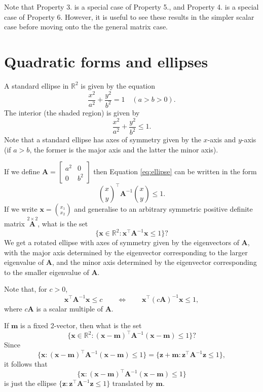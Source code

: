 \documentclass[]{book}
\theoremstyle{definition}
\theoremstyle{definition}
\theoremstyle{definition}
\theoremstyle{remark}
\begin{document}
Note that Property 3. is a special case of Property 5., and Property 4. is a special case of Property 6.
However, it is useful to see these results in the simpler scalar case before moving onto the the general matrix case.

\hypertarget{quadratic-forms-and-ellipses}{%
\section{Quadratic forms and ellipses}\label{quadratic-forms-and-ellipses}}

A standard ellipse in \(\mathbb{R}^2\) is given by the equation
\[
\frac{x^2}{a^2}+\frac{y^2}{b^2}=1 \quad (a>b>0).
\]
The interior (the shaded region) is given by
\begin{equation}
\frac{x^2}{a^2}+\frac{y^2}{b^2}\leq 1.   \label{eq:ellipse}
\end{equation}
Note that a standard ellipse has axes of symmetry given by the \(x\)-axis and \(y\)-axis
(if \(a>b\), the former is the major axis and the latter the minor axis).

If we define
\({\mathbf A}=\left[ \begin{array}{cc} a^2&0\\ 0&b^2 \end{array} \right]\)
then Equation \eqref{eq:ellipse} can be written in the form
\[ \binom{x}{y}^\top {\mathbf A}^{-1} \binom{x}{y}\leq 1. \]
If we write \({\mathbf x}=\binom{x_1}{x_2}\) and generalise to an arbitrary symmetric
positive definite matrix \(\stackrel{2 \times 2}{\mathbf A}\), what is the set
\[ \{ {\mathbf x} \in \mathbb{R}^2 : {\mathbf x}^\top {\mathbf A}^{-1} {\mathbf x} \leq 1\} ? \]
We get a rotated ellipse with axes of symmetry given by the eigenvectors of \(\mathbf A\),
with the major axis determined by the eigenvector corresponding to the larger
eigenvalue of \(\mathbf A\), and the minor axis determined by the eigenvector corresponding
to the smaller eigenvalue of \(\mathbf A\).

Note that, for \(c>0\),
\[{\mathbf x}^\top {\mathbf A}^{-1} {\mathbf x}\leq c \qquad \Leftrightarrow \qquad {\mathbf x}^\top (c{\mathbf A})^{-1}{\mathbf x}\leq 1 ,\]
where \(c{\mathbf A}\) is a scalar multiple of \(\mathbf A\).

If \({\mathbf m}\) is a fixed 2-vector, then what is the set
\[
\{ {\mathbf x} \in \mathbb{R}^2 : ({\mathbf x}-{\mathbf m})^\top {\mathbf A}^{-1}({\mathbf x}-{\mathbf m})\leq 1\} ?
\]
Since
\[
\{ {\mathbf x} : ({\mathbf x}-{\mathbf m})^\top {\mathbf A}^{-1}({\mathbf x}-{\mathbf m})\leq 1 \}=\{ {\mathbf z}+
{\mathbf m} : {\mathbf z}^\top {\mathbf A}^{-1} {\mathbf z}\leq 1 \} ,
\]
it follows that
\[
\{ {\mathbf x} : ({\mathbf x}-{\mathbf m})^\top {\mathbf A}^{-1}({\mathbf x}-{\mathbf m})\leq 1\}
\]
is just the ellipse \(\{ {\mathbf z}:{\mathbf z}^\top {\mathbf A}^{-1}{\mathbf z}\leq 1\}\) translated by
\({\mathbf m}\).
\end{document}
